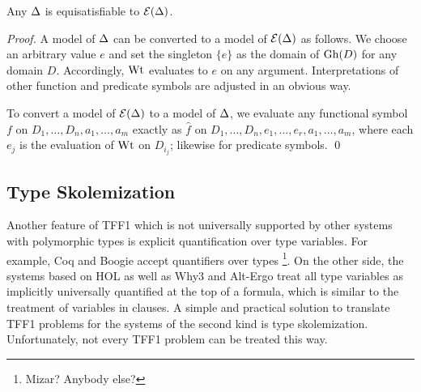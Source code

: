 \begin{theorem} \label{thm:eli}
Any $\mathrm{\Delta}$ is equisatisfiable to $\mathcal{E}(\mathrm{\Delta})$.
\end{theorem}
\begin{proof}
A model of $\mathrm{\Delta}$ can be converted to a model of $\mathcal{E}(\mathrm{\Delta})$
as follows. We choose an arbitrary value $e$ and set the singleton
$\{ e \}$ as the domain of $\mathrm{Gh}(D)$ for any domain $D$.
Accordingly, $\mathrm{Wt}$ evaluates to $e$ on any argument.
Interpretations of other function and predicate symbols are
adjusted in an obvious way.

To convert a model of $\mathcal{E}(\mathrm{\Delta})$
to a model of $\mathrm{\Delta}$, we evaluate any functional symbol
$f$ on $D_1,\dots,D_n,a_1,\dots,a_m$ exactly as
$\hat{f}$ on $D_1,\dots,D_n,e_1,\dots,e_r,a_1,\dots,a_m$,
where each $e_j$ is the evaluation of $\mathrm{Wt}$ on $D_{i_j}$;
likewise for predicate symbols.
\qed
\end{proof}

\subsection{Type Skolemization} \label{ssec:skol}

Another feature of TFF1 which is not universally supported
by other systems with polymorphic types is explicit
quantification over type variables.
For example, Coq and Boogie accept quantifiers over types%
\footnote{Mizar? Anybody else?}.
On the other side, the systems based on HOL as well as Why3 and
Alt-Ergo treat all type variables as implicitly universally
quantified at the top of a formula, which is similar to
the treatment of variables in clauses.
A simple and practical solution to translate TFF1 problems
for the systems of the second kind is type skolemization.
Unfortunately, not every TFF1 problem can be treated this way.

